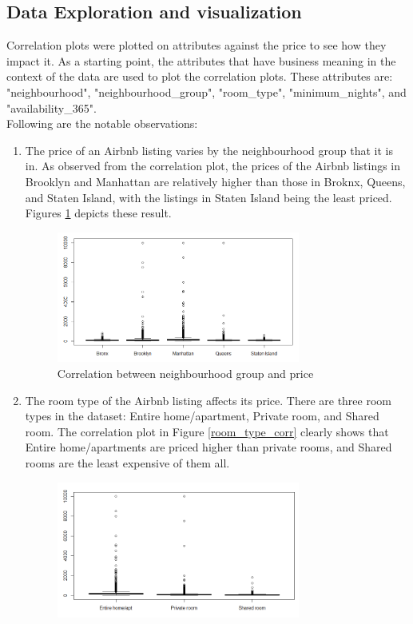 \documentclass{sig-alternate}
\begin{document}
	\subsection{Data Exploration and visualization}
	Correlation plots were plotted on attributes against the price to see how they impact it. As a starting point, the attributes that have business meaning in the context of the data are used to plot the correlation plots. These attributes are: "neighbourhood", "neighbourhood\_group", "room\_type", "minimum\_nights", and "availability\_365".\\
	Following are the notable observations:
	\begin{enumerate}
		\item The price of an Airbnb listing varies by the neighbourhood group that it is in. As observed from the correlation plot, the prices of the Airbnb listings in Brooklyn and Manhattan are relatively higher than those in Broknx, Queens, and Staten Island, with the listings in Staten Island being the least priced.
                Figures \ref{neighborhood_grp_corr} depicts these result.
	\begin{figure}[ht]
		\includegraphics[width=8cm]{neighborhood_grp_corr.png}
		\centering
		\caption{Correlation between neighbourhood group and price}
		\label{neighborhood_grp_corr}
	\end{figure}
		\item The room type of the Airbnb listing affects its price. There are three room types in the dataset: Entire home/apartment, Private room, and Shared room. The correlation plot in Figure \ref{room_type_corr} clearly shows that Entire home/apartments are priced higher than private rooms, and Shared rooms are the least expensive of them all.
	\begin{figure}[ht]
		\includegraphics[width=8cm]{room_type_corr.png}

\end{figure}
\end{enumerate}
\end{document}
